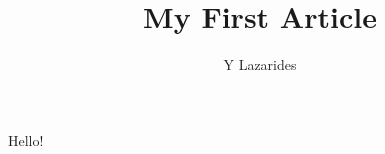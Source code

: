 \documentclass{article}
\begin{document}
\title{My First Article}
\author{Y Lazarides}
\maketitle
 Hello!
\end{document}
